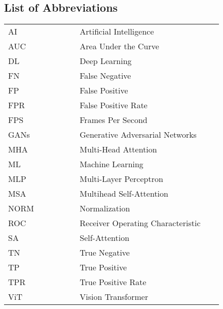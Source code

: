 \begin{center}
    \section*{List of Abbreviations}
    \begin{table}[h]
        \centering
        \renewcommand{\arraystretch}{1.5}
        \begin{tabular}{@{}p{0.3\linewidth}p{0.6\linewidth}@{}}
            AI   & Artificial Intelligence           \\
            AUC  & Area Under the Curve              \\
            DL   & Deep Learning                     \\
            FN   & False Negative                    \\
            FP   & False Positive                    \\
            FPR  & False Positive Rate               \\
            FPS  & Frames Per Second                 \\
            GANs & Generative Adversarial Networks   \\
            MHA  & Multi-Head Attention              \\
            ML   & Machine Learning                  \\
            MLP  & Multi-Layer Perceptron            \\
            MSA  & Multihead Self-Attention          \\
            NORM & Normalization                     \\
            ROC  & Receiver Operating Characteristic \\
            SA   & Self-Attention                    \\
            TN   & True Negative                     \\
            TP   & True Positive                     \\
            TPR  & True Positive Rate                \\
            ViT  & Vision Transformer                \\
        \end{tabular}
    \end{table}
\end{center}
